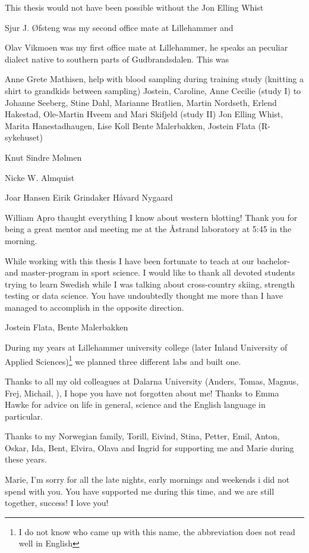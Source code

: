 \documentclass[twoside,10pt]{gihclass} %
\begin{document}
This thesis would not have been possible without the Jon Elling Whist

Sjur J. Øfsteng was my second office mate at Lillehammer and

Olav Vikmoen was my first office mate at Lillehammer, he speaks an peculiar dialect native to southern parts of Gudbrandsdalen. This was

Anne Grete Mathisen, help with blood sampling during training study (knitting a shirt to grandkids between sampling)
Jostein, Caroline, Anne Cecilie (study I)
to Johanne Seeberg, Stine Dahl, Marianne Bratlien, Martin Nordseth, Erlend Hakestad, Ole-Martin Hveem and Mari Skifjeld (study II)
Jon Elling Whist, Marita Hanestadhaugen, Lise Koll
Bente Malerbakken, Jostein Flata (R-sykehuset)

Knut Sindre Mølmen

Nicke W. Almquist

Joar Hansen
Eirik Grindaker
Håvard Nygaard

William Apro thaught everything I know about western blotting! Thank you for being a great mentor and meeting me at the Åstrand laboratory at 5:45 in the morning.

While working with this thesis I have been fortunate to teach at our bachelor- and master-program in sport science. I would like to thank all devoted students trying to learn Swedish while I was talking about cross-country skiing, strength testing or data science. You have undoubtedly thought me more than I have managed to accomplish in the opposite direction.

Jostein Flata, Bente Malerbakken

During my years at Lillehammer university college (later Inland University of Applied Sciences)\footnote{I do not know who came up with this name, the abbreviation does not read well in English} we planned three different labs and built one.

Thanks to all my old colleagues at Dalarna University (Anders, Tomas, Magnus, Frej, Michail, ), I hope you have not forgotten about me! Thanks to Emma Hawke for advice on life in general, science and the English language in particular.

Thanks to my Norwegian family, Torill, Eivind, Stina, Petter, Emil, Anton, Oskar, Ida, Bent, Elvira, Olava and Ingrid for supporting me and Marie during these years.

Marie, I'm sorry for all the late nights, early mornings and weekends i did not spend with you. You have supported me during this time, and we are still together, success! I love you!
\end{document}
